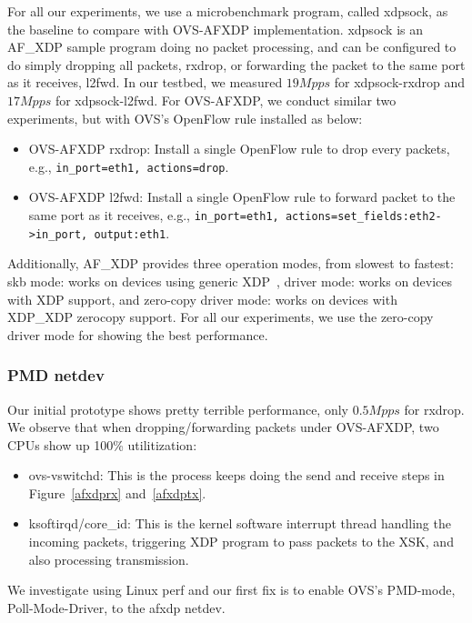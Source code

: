 \documentclass[10pt]{sigplanconf}
\newcommand{\mycomment}[1]{}
\begin{document}
For all our experiments, we use a microbenchmark program, called xdpsock,
as the baseline to compare with OVS-AFXDP implementation.
xdpsock is an AF\_XDP sample program doing no packet processing, and can be configured
to do simply dropping all packets, rxdrop, or forwarding the packet to the same port as
it receives, l2fwd.
In our testbed, we measured $19Mpps$ for xdpsock-rxdrop and $17Mpps$ for xdpsock-l2fwd.
For OVS-AFXDP, we conduct similar two experiments, but with OVS's OpenFlow rule installed as
below:
\begin{itemize}
\item OVS-AFXDP rxdrop: Install a single OpenFlow rule to drop every packets,
e.g.,  \texttt{in\_port=eth1, actions=drop}.
\item OVS-AFXDP l2fwd: Install a single OpenFlow rule to forward packet to the same port
as it receives, e.g., \texttt{in\_port=eth1, actions=set\_fields:eth2->in\_port, output:eth1}.
\end{itemize}

Additionally, AF\_XDP provides three operation modes, from slowest to fastest:
skb mode: works on devices using generic XDP~\cite{genericxdp},
driver mode: works on devices with XDP support, and
zero-copy driver mode: works on devices with XDP\_XDP zerocopy support.
For all our experiments, we use the zero-copy driver mode for showing the best performance.

\subsubsection{PMD netdev}
Our initial prototype shows pretty terrible performance, only $0.5Mpps$ for rxdrop.
We observe that when dropping/forwarding packets under OVS-AFXDP, two CPUs show up
100\% utilitization:
\begin{itemize}
\item ovs-vswitchd: This is the process keeps doing the send and receive steps
in Figure~\ref{afxdprx} and~\ref{afxdptx}.
\item ksoftirqd/core\_id: This is the kernel software interrupt thread handling the
incoming packets, triggering XDP program to pass packets to the XSK, and also
processing transmission.
\end{itemize}
\mycomment{Compared to xdpsock, ovs-vswitchd adds on top of it a umempool,
and packets parsing, lookup and action execution.}
We investigate using Linux perf and our first fix is to enable OVS's PMD-mode,
Poll-Mode-Driver, to the afxdp netdev.
\end{document}
